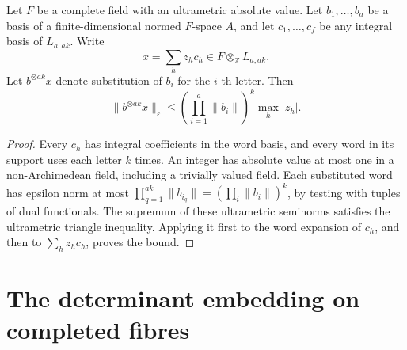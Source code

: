 \begin{lemma}
\label{lem:contraction-balanced-words}
\leanok
Let $F$ be a complete field with an ultrametric absolute value.
Let $b_1,\ldots,b_a$ be a basis of a finite-dimensional normed $F$-space $A$,
and let $c_1,\ldots,c_f$
be any integral basis of $L_{a,ak}$. Write
\[
 x=\sum_h z_hc_h\in F\otimes_{\mathbb Z}L_{a,ak}.
\]
Let $b^{\otimes ak}x$ denote substitution of $b_i$ for the $i$-th letter.
Then
\[
 \|b^{\otimes ak}x\|_\varepsilon
 \leq\left(\prod_{i=1}^a\|b_i\|\right)^k\max_h|z_h|.
\]
\end{lemma}
\begin{proof}
Every $c_h$ has integral coefficients in the word basis, and every word in
its support uses each letter $k$ times. An integer has absolute value at most
one in a non-Archimedean field, including a trivially valued field.
Each substituted word has epsilon norm at most
$\prod_{q=1}^{ak}\|b_{i_q}\|=(\prod_i\|b_i\|)^k$, by testing with
tuples of dual functionals. The supremum of these ultrametric seminorms
satisfies the ultrametric triangle inequality. Applying it first to the word
expansion of $c_h$, and then to $\sum_hz_hc_h$, proves the bound.
\end{proof}

\section{The determinant embedding on completed fibres}

